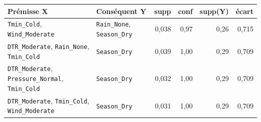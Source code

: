\footnotesize
\begin{tabular}{>{\raggedright\arraybackslash}p{4.7cm}>{\raggedright\arraybackslash}p{4.4cm}rrrr}
\toprule
\rowcolor{NuitBleue!90}
\color{white}\textbf{Prémisse X} & \color{white}\textbf{Conséquent Y} & \color{white}\textbf{supp} & \color{white}\textbf{conf} & \color{white}\textbf{supp(Y)} & \color{white}\textbf{écart} \\
\midrule
\texttt{Tmin\_Cold}, \texttt{Wind\_Moderate} & \texttt{Rain\_None}, \texttt{Season\_Dry} & 0,038 & 0,97 & 0,26 & 0,715 \\
\texttt{DTR\_Moderate}, \texttt{Rain\_None}, \texttt{Tmin\_Cold} & \texttt{Season\_Dry} & 0,039 & 1,00 & 0,29 & 0,709 \\
\texttt{DTR\_Moderate}, \texttt{Pressure\_Normal}, \texttt{Tmin\_Cold} & \texttt{Season\_Dry} & 0,032 & 1,00 & 0,29 & 0,709 \\
\texttt{DTR\_Moderate}, \texttt{Tmin\_Cold}, \texttt{Wind\_Moderate} & \texttt{Season\_Dry} & 0,031 & 1,00 & 0,29 & 0,709 \\
\bottomrule
\end{tabular}
